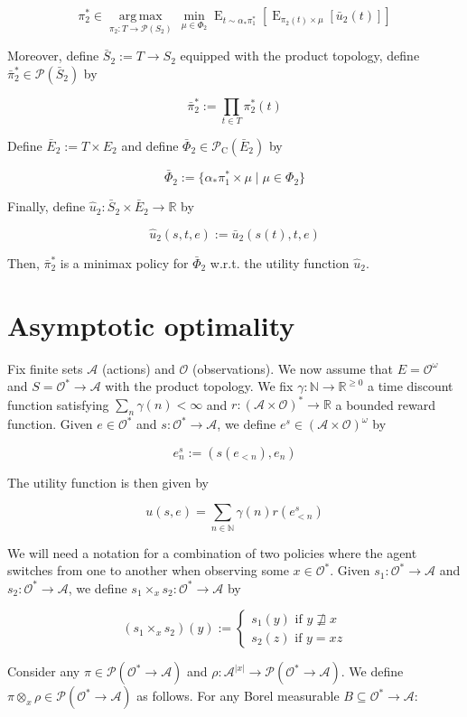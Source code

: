 \documentclass[a4paper]{article}
\DeclareMathOperator{\E}{E}
\newcommand{\Argmax}[1]{\underset{#1}{\operatorname{arg\,max}}\,}
\newcommand{\Nats}{\mathbb{N}}
\newcommand{\Reals}{\mathbb{R}}
\newcommand{\Abs}[1]{\lvert #1 \rvert}
\newcommand{\Prob}{\mathcal{P}}
\newcommand{\Act}{\mathcal{A}}
\newcommand{\Obs}{\mathcal{O}}
\newcommand{\ObsO}{\Obs^\omega}
\newcommand{\Pol}{\Obs^* \rightarrow \Act}
\newcommand{\CC}{\mathcal{P}_{\operatorname{C}}}
\begin{document}
$$\pi_2^* \in \Argmax{\pi_2: T \rightarrow \Prob(S_2)} \min_{\mu \in \Phi_2} \E_{t \sim \alpha_*\pi_1^*}[\E_{\pi_2(t) \times \mu}[\bar{u}_2(t)]]$$

Moreover, define ${\bar{S}_2:=T \rightarrow S_2}$ equipped with the product topology, define ${\bar{\pi}_2^* \in \Prob(\bar{S}_2)}$ by

$${\bar{\pi}_2^* := \prod_{t \in T} \pi_2^*(t)}$$

Define ${\bar{E}_2:=T \times E_2}$ and define ${\bar{\Phi}_2 \in \CC(\bar{E}_2)}$ by

$$\bar{\Phi}_2:=\{\alpha_* \pi_1^* \times \mu \mid \mu \in \Phi_2\}$$

Finally, define ${\hat{u}_2: \bar{S}_2 \times \bar{E}_2 \rightarrow \Reals}$ by

$$\hat{u}_2(s,t,e):=\bar{u}_2(s(t),t,e)$$

Then, ${\bar{\pi}_2^*}$ is a minimax policy for ${\bar{\Phi}_2}$ w.r.t. the utility function ${\hat{u}_2}$.

\section{Asymptotic optimality}

Fix finite sets ${\Act}$ (actions) and ${\Obs}$ (observations). We now assume that ${E=\ObsO}$ and ${S=\Pol}$ with the product topology. We fix ${\gamma: \Nats \rightarrow \Reals^{\geq 0}}$ a time discount function satisfying ${\sum_n \gamma(n) < \infty}$ and ${r: (\Act \times \Obs)^* \rightarrow \Reals}$ a bounded reward function. Given ${e \in \Obs^*}$ and ${s: \Pol}$, we define ${e^s \in (\Act \times \Obs)^\omega}$ by

$${e^s_n:=(s(e_{<n}),e_n)}$$

The utility function is then given by

$$u(s,e)=\sum_{n \in \Nats} \gamma(n) r(e^s_{<n})$$

We will need a notation for a combination of two policies where the agent switches from one to another when observing some ${x \in \Obs^*}$. Given ${s_1: \Pol}$ and ${s_2: \Pol}$, we define ${s_1 \times_x s_2: \Pol}$ by

$$(s_1 \times_x s_2)(y):=\begin{cases}s_1(y) \text{ if } y \not\sqsupseteq x \\s_2(z) \text{ if } y=xz\end{cases}$$

Consider any ${\pi \in \Prob(\Pol)}$ and ${\rho: \Act^{\Abs{x}} \rightarrow \Prob(\Pol)}$. We define ${\pi \otimes_x \rho \in \Prob(\Obs^* \rightarrow \Act)}$ as follows. For any Borel measurable ${B \subseteq \Pol}$:
\end{document}
